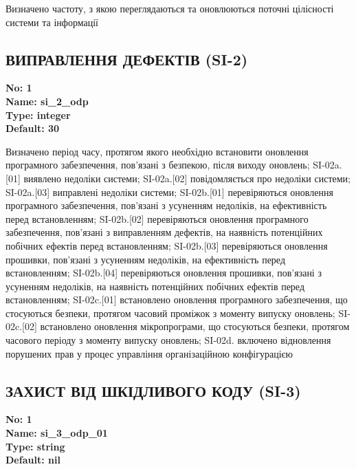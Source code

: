 \documentclass{article}
\begin{document}
{\footnotesize Визначено частоту, з якою переглядаються та оновлюються поточні цілісності системи та інформації}




\subsection{ВИПРАВЛЕННЯ ДЕФЕКТІВ (SI-2)}


\vspace{10pt}
{\footnotesize\bfseries
No: 1\\
Name: si\_\allowbreak{}2\_\allowbreak{}odp\\
Type: integer\\
Default: 30
}

{\footnotesize Визначено період часу, протягом якого необхідно встановити оновлення програмного забезпечення, пов'язані з безпекою, після виходу оновлень; SI-02a.[01] виявлено недоліки системи; SI-02a.[02] повідомляється про недоліки системи; SI-02a.[03] виправлені недоліки системи; SI-02b.[01] перевіряються оновлення програмного забезпечення, пов'язані з усуненням недоліків, на ефективність перед встановленням; SI-02b.[02] перевіряються оновлення програмного забезпечення, пов'язані з виправленням дефектів, на наявність потенційних побічних ефектів перед встановленням; SI-02b.[03] перевіряються оновлення прошивки, пов'язані з усуненням недоліків, на ефективність перед встановленням; SI-02b.[04] перевіряються оновлення прошивки, пов'язані з усуненням недоліків, на наявність потенційних побічних ефектів перед встановленням; SI-02c.[01] встановлено оновлення програмного забезпечення, що стосуються безпеки, протягом часовий проміжок з моменту випуску оновлень; SI-02c.[02] встановлено оновлення мікропрограми, що стосуються безпеки, протягом часового періоду з моменту випуску оновлень; SI-02d. включено відновлення порушених прав у процес управління організаційною конфігурацією}




\subsection{ЗАХИСТ ВІД ШКІДЛИВОГО КОДУ (SI-3)}


\vspace{10pt}
{\footnotesize\bfseries
No: 1\\
Name: si\_\allowbreak{}3\_\allowbreak{}odp\_\allowbreak{}01\\
Type: string\\
Default: nil
}
\end{document}

